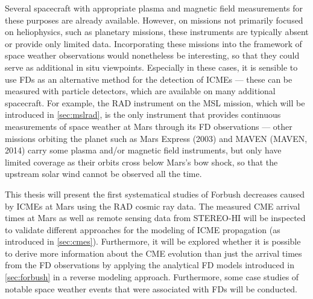 Several spacecraft with appropriate plasma and magnetic field measurements for these purposes are already available. However, on missions not primarily focused on heliophysics, such as planetary missions, these instruments are typically absent or provide only limited data. Incorporating these missions into the framework of space weather observations would nonetheless be interesting, so that they could serve as additional in situ viewpoints. Especially in these cases, it is sensible to use \acp{FD} as an alternative method for the detection of \acp{ICME} --- these can be measured with particle detectors, which are available on many additional spacecraft. For example, the \ac{RAD} instrument on the \ac{MSL} mission, which will be introduced in \autoref{sec:mslrad}, is the only instrument that provides continuous measurements of space weather at Mars through its \ac{FD} observations --- other missions orbiting the planet such as Mars Express (2003) and \acl{MAVEN} (\acs{MAVEN}, 2014) carry some plasma and/or magnetic field instruments, but only have limited coverage as their orbits cross below Mars's bow shock, so that the upstream solar wind cannot be observed all the time.

This thesis will present the first systematical studies of Forbush decreases caused by \acp{ICME} at Mars using the \ac{RAD} cosmic ray data. The measured \ac{CME} arrival times at Mars as well as remote sensing data from \ac{STEREO}-\ac{HI} will be inspected to validate different approaches for the modeling of \ac{ICME} propagation (as introduced in \autoref{sec:cmes}). Furthermore, it will be explored whether it is possible to derive more information about the \ac{CME} evolution than just the arrival times from the \ac{FD} observations by applying the analytical \ac{FD} models introduced in \autoref{sec:forbush} in a reverse modeling approach. Furthermore, some case studies of notable space weather events that were associated with \acp{FD} will be conducted.

